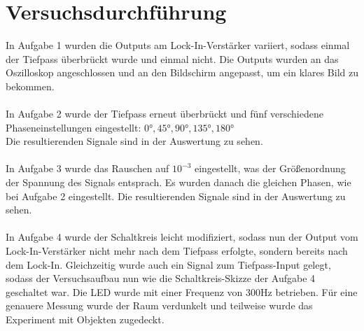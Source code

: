 \documentclass[captions=tableheading]{scrartcl}
\begin{document}
\section{Versuchsdurchführung}
In Aufgabe 1 wurden die Outputs am Lock-In-Verstärker variiert, sodass einmal der Tiefpass überbrückt wurde und einmal nicht.
Die Outputs wurden an das Oszilloskop angeschlossen und an den Bildschirm angepasst, um ein klares Bild zu bekommen.
\\ \\
In Aufgabe 2 wurde der Tiefpass erneut überbrückt und fünf verschiedene Phaseneinstellungen eingestellt: \(0°, 45°, 90°, 135°, 180°\) \\
Die resultierenden Signale sind in der Auswertung zu sehen.
\\ \\
In Aufgabe 3 wurde das Rauschen auf $10^{-3}$ eingestellt, was der Größenordnung der Spannung des Signals entsprach.
Es wurden danach die gleichen Phasen, wie bei Aufgabe 2 eingestellt.
Die resultierenden Signale sind in der Auswertung zu sehen.
\\ \\
In Aufgabe 4 wurde der Schaltkreis leicht modifiziert, sodass nun der Output vom Lock-In-Verstärker nicht mehr nach dem Tiefpass erfolgte, 
sondern bereits nach dem Lock-In. 
Gleichzeitig wurde auch ein Signal zum Tiefpass-Input gelegt, sodass der Versuchsaufbau nun wie die Schaltkreis-Skizze der Aufgabe 4 geschaltet war.
Die LED wurde mit einer Frequenz von 300Hz betrieben. 
Für eine genauere Messung wurde der Raum verdunkelt und teilweise wurde das Experiment mit Objekten zugedeckt.
\newpage
\end{document}
